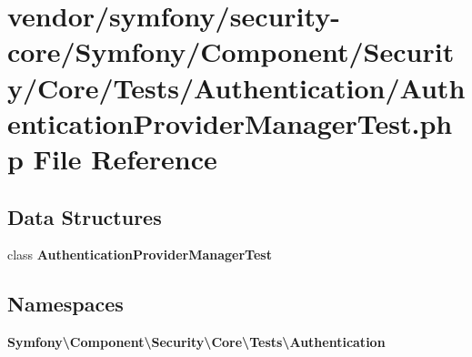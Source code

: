 \section{vendor/symfony/security-\/core/\+Symfony/\+Component/\+Security/\+Core/\+Tests/\+Authentication/\+Authentication\+Provider\+Manager\+Test.php File Reference}
\label{_authentication_provider_manager_test_8php}
\subsection*{Data Structures}
\begin{DoxyCompactItemize}
\item 
class {\bf Authentication\+Provider\+Manager\+Test}
\end{DoxyCompactItemize}
\subsection*{Namespaces}
\begin{DoxyCompactItemize}
\item 
 {\bf Symfony\textbackslash{}\+Component\textbackslash{}\+Security\textbackslash{}\+Core\textbackslash{}\+Tests\textbackslash{}\+Authentication}
\end{DoxyCompactItemize}

